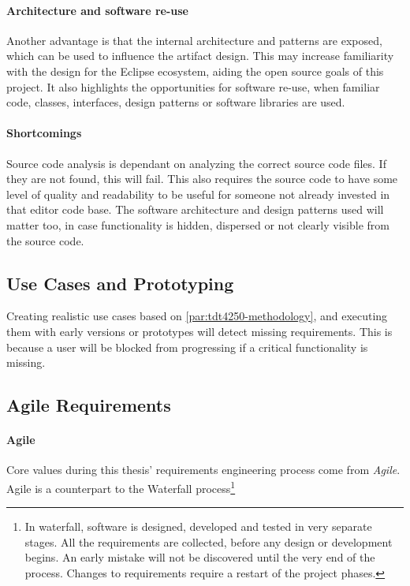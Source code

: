 \paragraph{Architecture and software re-use}
Another advantage is that the internal architecture and patterns are exposed, which can be used to influence the artifact design.
This may increase familiarity with the design for the Eclipse ecosystem, aiding the \gls{open source} goals of this project.
It also highlights the opportunities for software re-use, when familiar code, classes, interfaces, design patterns or software libraries are used.


\paragraph{Shortcomings}
Source code analysis is dependant on analyzing the correct source code files.
If they are not found, this will fail.
This also requires the source code to have some level of quality and readability to be useful for someone not already invested in that editor code base.
The software architecture and design patterns used will matter too, in case functionality is hidden, dispersed or not clearly visible from the source code.


\subsection{Use Cases and Prototyping}

Creating realistic use cases based on \cref{par:tdt4250-methodology}, and executing them with early versions or prototypes will detect missing requirements.
This is because a user will be blocked from progressing if a critical functionality is missing.


\subsection{Agile Requirements}\label{subsec:req-agile}

\paragraph{Agile}
Core values during this thesis' requirements engineering process come from \textit{Agile}.
Agile is a counterpart to the Waterfall process\footnote{In waterfall, software is designed, developed and tested in very separate stages. All the requirements are collected, before any design or development begins. An early mistake will not be discovered until the very end of the process. Changes to requirements require a restart of the project phases.}


